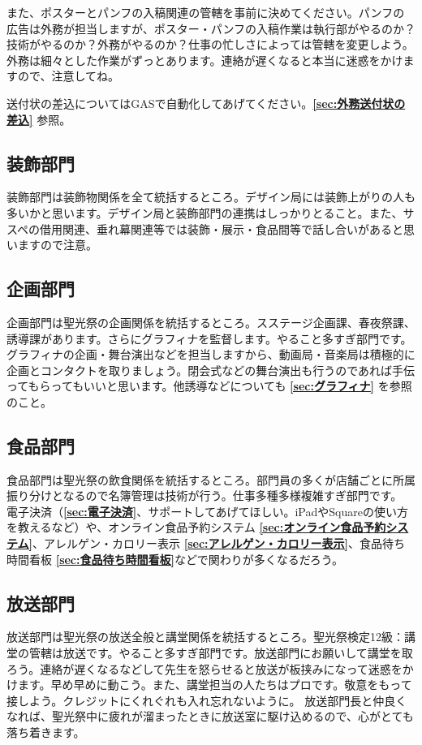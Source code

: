 \documentclass[a4paper]{ltjsreport}
\begin{document}
また、ポスターとパンフの入稿関連の管轄を事前に決めてください。パンフの広告は外務が担当しますが、ポスター・パンフの入稿作業は執行部がやるのか？技術がやるのか？外務がやるのか？仕事の忙しさによっては管轄を変更しよう。外務は細々とした作業がずっとあります。連絡が遅くなると本当に迷惑をかけますので、注意してね。

送付状の差込についてはGASで自動化してあげてください。{\bfseries \ref{sec:外務送付状の差込}} 参照。

\subsection{装飾部門}
装飾部門は装飾物関係を全て統括するところ。デザイン局には装飾上がりの人も多いかと思います。デザイン局と装飾部門の連携はしっかりとること。また、サスペの借用関連、垂れ幕関連等では装飾・展示・食品間等で話し合いがあると思いますので注意。

\subsection{企画部門}
企画部門は聖光祭の企画関係を統括するところ。スステージ企画課、春夜祭課、誘導課があります。さらにグラフィナを監督します。やること多すぎ部門です。
グラフィナの企画・舞台演出などを担当しますから、動画局・音楽局は積極的に企画とコンタクトを取りましょう。閉会式などの舞台演出も行うのであれば手伝ってもらってもいいと思います。他誘導などについても {\bfseries \ref{sec:グラフィナ}} を参照のこと。

\subsection{食品部門}
食品部門は聖光祭の飲食関係を統括するところ。部門員の多くが店舗ごとに所属振り分けとなるので名簿管理は技術が行う。仕事多種多様複雑すぎ部門です。
電子決済（{\bfseries \ref{sec:電子決済}}、サポートしてあげてほしい。iPadやSquareの使い方を教えるなど）や、オンライン食品予約システム {\bfseries \ref{sec:オンライン食品予約システム}}、アレルゲン・カロリー表示 {\bfseries \ref{sec:アレルゲン・カロリー表示}}、食品待ち時間看板 {\bfseries \ref{sec:食品待ち時間看板}}などで関わりが多くなるだろう。

\subsection{放送部門}
放送部門は聖光祭の放送全般と講堂関係を統括するところ。聖光祭検定12級：講堂の管轄は放送です。やること多すぎ部門です。放送部門にお願いして講堂を取ろう。連絡が遅くなるなどして先生を怒らせると放送が板挟みになって迷惑をかけます。早め早めに動こう。また、講堂担当の人たちはプロです。敬意をもって接しよう。クレジットにくれぐれも入れ忘れないように。
放送部門長と仲良くなれば、聖光祭中に疲れが溜まったときに放送室に駆け込めるので、心がとても落ち着きます。
\end{document}

